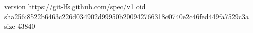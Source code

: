 version https://git-lfs.github.com/spec/v1
oid sha256:8522b6463c226d034902d99950b200942766318c0740e2c46fed449fa7529c3a
size 43840
